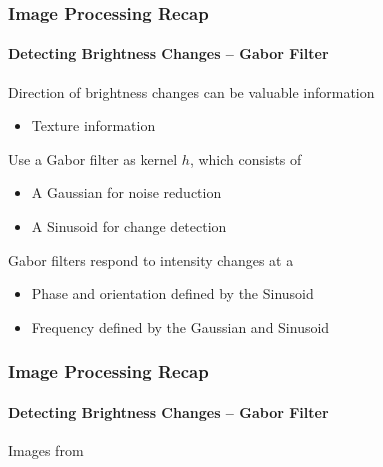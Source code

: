 \documentclass[xetex,professionalfont]{beamer}
\begin{document}

\begin{frame}
\frametitle{Image Processing Recap}
\framesubtitle{Detecting Brightness Changes -- Gabor Filter}

Direction of brightness changes can be valuable information
\begin{itemize}
    \item Texture information
\end{itemize}

\bigskip
Use a Gabor filter as kernel $h$, which consists of
\begin{itemize}
    \item A Gaussian for noise reduction
    \item A Sinusoid for change detection 
\end{itemize}

\bigskip
Gabor filters respond to intensity changes at a
\begin{itemize}
    \item Phase and orientation defined by the Sinusoid %
    \item Frequency defined by the Gaussian and Sinusoid
\end{itemize}

\end{frame}


\begin{frame}
\frametitle{Image Processing Recap}
\framesubtitle{Detecting Brightness Changes -- Gabor Filter}

\begin{center}
    {\centering Images from \cite{prince12}}
\end{center}

\end{frame}
\end{document}
